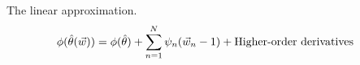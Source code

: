 \begin{frame}{The linear approximation.}
%
\begin{align*}
%
\thetafun(\thetahat(\w)) ={}&
\thetafun(\thetahat) + \sumn \infl_n (\w_n - 1) +
\textrm{Higher-order derivatives}
%
\end{align*}
%
\end{frame}





